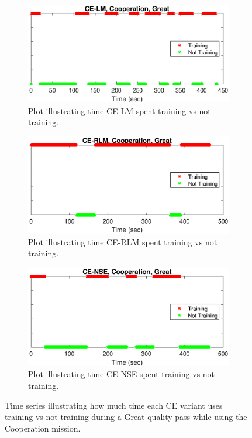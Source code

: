 \begin{figure}[h]
\begin{subfigure}{\linewidth}
\centering
\includegraphics[scale=0.7]{figures/flight_results/coop_great_lm_trainRate.eps}
\caption{Plot illustrating time CE-LM spent training vs not training.}
\label{fig:flightCoopGreatMeanMed}
\end{subfigure} 
\begin{subfigure}{\linewidth}
\centering
\includegraphics[scale=0.7]{figures/flight_results/coop_great_rlm_trainRate.eps}
\caption{Plot illustrating time CE-RLM spent training vs not training.}
\label{fig:flightCoopGoodMeanMed}
\end{subfigure}
\begin{subfigure}{\linewidth}
\centering
\includegraphics[scale=0.7]{figures/flight_results/coop_great_nse_trainRate.eps}
\caption{Plot illustrating time CE-NSE spent training vs not training.}
\label{fig:flightCoopGoodUnweightSum}
\end{subfigure}

\caption{Time series illustrating how much time each CE variant uses training vs not training during a Great quality pass while using the Cooperation mission.}
\label{fig:trainingTimeSeries}
\end{figure}

